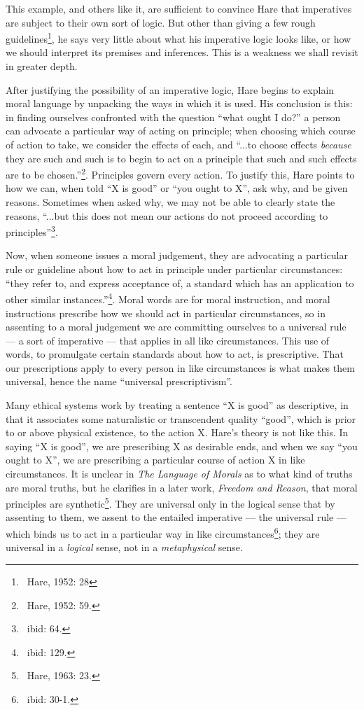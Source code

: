 \documentclass[12pt]{article}
\begin{document}
This example, and others like it, are sufficient to convince Hare that imperatives are subject to their own sort of logic. But other than giving a few rough guidelines\footnote{~Hare, 1952: 28}, he says very little about what his imperative logic looks like, or how we should interpret its premises and inferences. This is a weakness we shall revisit in greater depth.

After justifying the possibility of an imperative logic, Hare begins to explain moral language by unpacking the ways in which it is used. His conclusion is this: in finding ourselves confronted with the question ``what ought I do?'' a person can advocate a particular way of acting on principle; when choosing which course of action to take, we consider the effects of each, and ``...to choose effects \textit{because} they are such and such is to begin to act on a principle that such and such effects are to be chosen.''\footnote{~Hare, 1952: 59.}. Principles govern every action. To justify this, Hare points to how we can, when told ``X is good'' or ``you ought to X'', ask why, and be given reasons. Sometimes when asked why, we may not be able to clearly state the reasons, ``...but this does not mean our actions do not proceed according to principles''\footnote{~ibid: 64.}.

Now, when someone issues a moral judgement, they are advocating a particular rule or guideline about how to act in principle under particular circumstances: ``they refer to, and express acceptance of, a standard which has an application to other similar instances.''\footnote{~ibid: 129.}. Moral words are for moral instruction, and moral instructions prescribe how we should act in particular circumstances, so in assenting to a moral judgement we are committing ourselves to a universal rule --- a sort of imperative --- that applies in all like circumstances. This use of words, to promulgate certain standards about how to act, is prescriptive. That our prescriptions apply to every person in like circumstances is what makes them universal, hence the name ``universal prescriptivism''.

Many ethical systems work by treating a sentence ``X is good'' as descriptive, in that it associates some naturalistic or transcendent quality ``good'', which is prior to or above physical existence, to the action X. Hare's theory is not like this. In saying ``X is good'', we are prescribing X as desirable ends, and when we say ``you ought to X'', we are prescribing a particular course of action X in like circumstances. It is unclear in \textit{The Language of Morals} as to what kind of truths are moral truths, but he clarifies in a later work, \textit{Freedom and Reason}, that moral principles are synthetic\footnote{~Hare, 1963: 23.}. They are universal only in the logical sense that by assenting to them, we assent to the entailed imperative --- the universal rule --- which binds us to act in a particular way in like circumstances\footnote{~ibid: 30-1.}; they are universal in a \textit{logical} sense, not in a \textit{metaphysical} sense.
\end{document}
